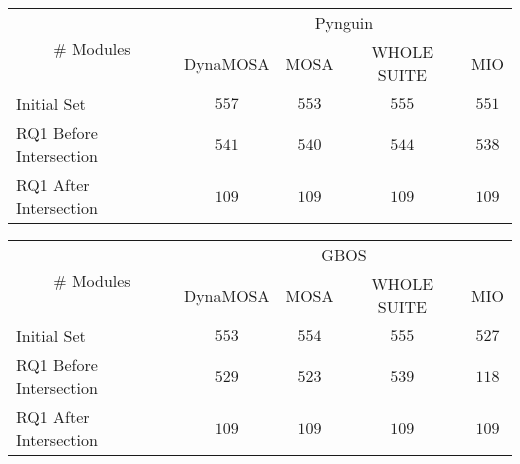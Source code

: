 
\begin{tabular}{lcccc}\toprule
    \multicolumn{1}{c}{\multirow{2}{*}{\# Modules}} & \multicolumn{4}{c}{Pynguin}                \\ \cmidrule(lr){2-5}
    \multicolumn{1}{c}{}                          & DynaMOSA & MOSA    & WHOLE SUITE & MIO     \\ \midrule
    Initial Set                                     & \(557\)  & \(553\) & \(555\)     & \(551\) \\
    RQ1 Before Intersection                         & \(541\)  & \(540\) & \(544\)     & \(538\) \\
    RQ1 After Intersection                          & \(109\)  & \(109\) & \(109\)     & \(109\) \\ 
    \bottomrule
  \end{tabular}
  \centering 
  \begin{tabular}{lcccc}\toprule
    \multicolumn{1}{c}{\multirow{2}{*}{\# Modules}} & \multicolumn{4}{c}{GBOS}                   \\ \cmidrule(lr){2-5}
    \multicolumn{1}{c}{}                          & DynaMOSA & MOSA    & WHOLE SUITE & MIO     \\ \midrule
    Initial Set                                     & \(553\)  & \(554\) & \(555\)     & \(527\) \\
    RQ1 Before Intersection                         & \(529\)  & \(523\) & \(539\)     & \(118\) \\
    RQ1 After Intersection                          & \(109\)  & \(109\) & \(109\)     & \(109\) \\ 
    \bottomrule
\end{tabular}
